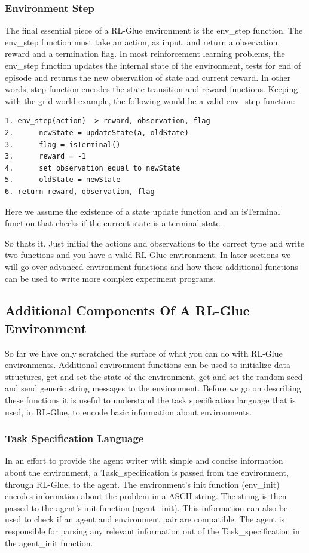 \documentclass[11pt]{article}
\begin{document}
\subsubsection{Environment Step}
The final essential piece of a RL-Glue environment is the env\_step function. The env\_step function must take an action, as input, and return a observation, reward and a termination flag. In most reinforcement learning problems, the  env\_step function updates the internal state of the environment, tests for end of episode and returns the new observation of state and current reward. In other words, step function encodes the state transition and reward functions. Keeping with the grid world example, the following would be a valid env\_step function:
\begin{verbatim}
1. env_step(action) -> reward, observation, flag 
2.      newState = updateState(a, oldState)
3.      flag = isTerminal()
3.      reward = -1
4.      set observation equal to newState
5.      oldState = newState
6. return reward, observation, flag
\end{verbatim}
Here we assume the existence of a state update function and an isTerminal function that checks if the current state is a terminal state.

So thats it. Just initial the actions and observations to the correct type and write two functions and you have a valid RL-Glue environment. In later sections we will go over advanced environment functions and how these additional functions can be used to write more complex experiment programs. 

\subsection{Additional Components Of A RL-Glue Environment}
\label{envp2}

So far we have only scratched the surface of what you can do with RL-Glue environments. Additional environment functions can be used to initialize data structures, get and set the state of the environment, get and set the random seed and send generic string messages to the environment. Before we go on describing these functions it is useful to understand the task specification language that is used, in RL-Glue, to encode basic information about environments. 

\subsubsection{Task Specification Language}
\label{task}
In an effort to provide the agent writer with simple and concise information about the environment, a Task\_specification is passed from the environment, through RL-Glue, to the agent. The environment's init function (env\_init) encodes information about the problem in a ASCII string. The string is then passed to the agent's init function (agent\_init).  This information can also be used to check if an agent and environment pair are compatible. The agent is responsible for parsing any relevant information out of the Task\_specification in the agent\_init function. 
\end{document}
